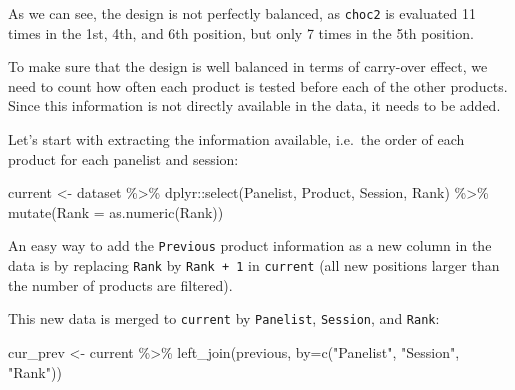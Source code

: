 \documentclass[
]{krantz}
\makeatletter
\newenvironment{Shaded}{\begin{snugshade}}{\end{snugshade}}
\newcommand{\AttributeTok}[1]{\textcolor[rgb]{0.61,0.61,0.61}{#1}}
\newcommand{\DecValTok}[1]{\textcolor[rgb]{0.06,0.06,0.06}{#1}}
\newcommand{\FunctionTok}[1]{\textcolor[rgb]{0,0,0}{#1}}
\newcommand{\NormalTok}[1]{#1}
\newcommand{\OtherTok}[1]{\textcolor[rgb]{0.37,0.37,0.37}{#1}}
\newcommand{\SpecialCharTok}[1]{\textcolor[rgb]{0,0,0}{#1}}
\newcommand{\StringTok}[1]{\textcolor[rgb]{0.5,0.5,0.5}{#1}}
\newenvironment{kframe}{%
\medskip{}
\setlength{\fboxsep}{.8em}
 \def\at@end@of@kframe{}%
 \ifinner\ifhmode%
  \def\at@end@of@kframe{\end{minipage}}%
  \begin{minipage}{\columnwidth}%
 \fi\fi%
 \def\FrameCommand##1{\hskip\@totalleftmargin \hskip-\fboxsep
 \colorbox{shadecolor}{##1}\hskip-\fboxsep
     \hskip-\linewidth \hskip-\@totalleftmargin \hskip\columnwidth}%
 \MakeFramed {\advance\hsize-\width
   \@totalleftmargin\z@ \linewidth\hsize
   \@setminipage}}%
 {\par\unskip\endMakeFramed%
 \at@end@of@kframe}
\renewenvironment{Shaded}{\begin{kframe}}{\end{kframe}}
\makeatother
\begin{document}
As we can see, the design is not perfectly balanced, as \texttt{choc2} is evaluated 11 times in the 1st, 4th, and 6th position, but only 7 times in the 5th position.

To make sure that the design is well balanced in terms of carry-over effect, we need to count how often each product is tested before each of the other products. Since this information is not directly available in the data, it needs to be added.

Let's start with extracting the information available, i.e.~the order of each product for each panelist and session:

\begin{Shaded}
\begin{Highlighting}[]
\NormalTok{current }\OtherTok{\textless{}{-}}\NormalTok{ dataset }\SpecialCharTok{\%\textgreater{}\%} 
\NormalTok{  dplyr}\SpecialCharTok{::}\FunctionTok{select}\NormalTok{(Panelist, Product, Session, Rank) }\SpecialCharTok{\%\textgreater{}\%} 
  \FunctionTok{mutate}\NormalTok{(}\AttributeTok{Rank =} \FunctionTok{as.numeric}\NormalTok{(Rank))}
\end{Highlighting}
\end{Shaded}

An easy way to add the \texttt{Previous} product information as a new column in the data is by replacing \texttt{Rank} by \texttt{Rank\ +\ 1} in \texttt{current} (all new positions larger than the number of products are filtered).

\begin{Shaded}
\end{Shaded}

This new data is merged to \texttt{current} by \texttt{Panelist}, \texttt{Session}, and \texttt{Rank}:

\begin{Shaded}
\begin{Highlighting}[]
\NormalTok{cur\_prev }\OtherTok{\textless{}{-}}\NormalTok{ current }\SpecialCharTok{\%\textgreater{}\%} 
  \FunctionTok{left\_join}\NormalTok{(previous, }\AttributeTok{by=}\FunctionTok{c}\NormalTok{(}\StringTok{"Panelist"}\NormalTok{, }\StringTok{"Session"}\NormalTok{, }\StringTok{"Rank"}\NormalTok{))}
\end{Highlighting}
\end{Shaded}
\end{document}
